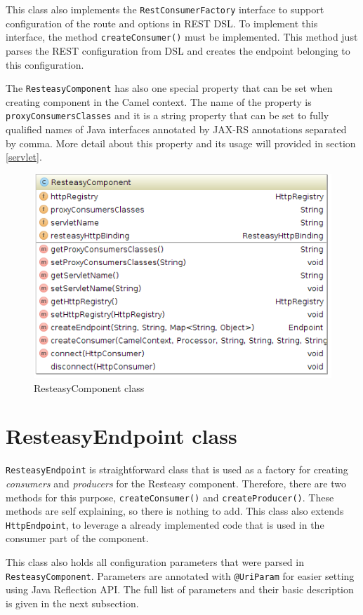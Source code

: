 \documentclass[12pt,final,oneside]{fithesis2}
\begin{document}
This class also implements the \texttt{RestConsumerFactory} interface to support configuration of the route and options in REST DSL. To implement this interface, the method \texttt{createConsumer()} must be implemented. This method just parses the REST configuration from DSL and creates the endpoint belonging to this configuration.

The \texttt{ResteasyComponent} has also one special property that can be set when creating component in the Camel context. The name of the property is \texttt{proxyConsumersClasses} and it is a string property that can be set to fully qualified names of Java interfaces annotated by JAX-RS annotations separated by comma. More detail about this property and its usage will provided in section \ref{servlet}.

\begin{figure}[h]
\centering
\includegraphics[width=0.8\linewidth]{images/component.png}
\caption{ResteasyComponent class}
\label{comp}
\end{figure}

\section{ResteasyEndpoint class}
\texttt{ResteasyEndpoint}  is straightforward class that is used as a factory for creating \textit{consumers} and \textit{producers} for the Resteasy component. Therefore, there are two methods for this purpose, \texttt{createConsumer()} and \texttt{createProducer()}. These methods are self explaining, so there is nothing to add. This class also extends \texttt{HttpEndpoint}, to leverage a already implemented code that is used in the consumer part of the component.

This class also holds all configuration parameters that were parsed in \texttt{ResteasyComponent}. Parameters are annotated with \texttt{@UriParam} for easier setting using Java Reflection API. The full list of parameters and their basic description is given in the next subsection.
\end{document}
